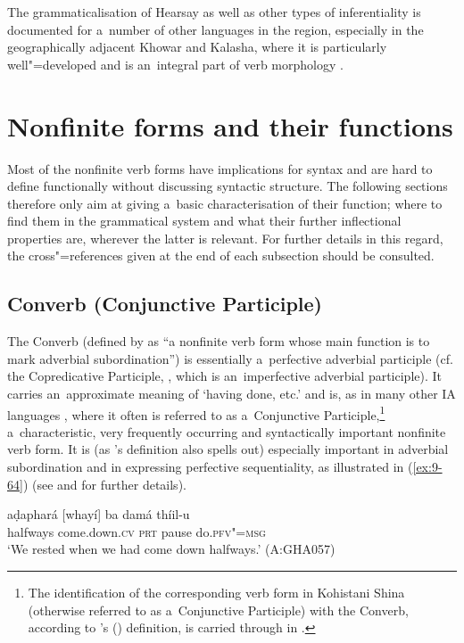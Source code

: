 The grammaticalisation of Hearsay as well as other types of inferentiality is documented for a~number of other languages in the region, especially in the geographically adjacent Khowar and Kalasha, where it is particularly well"=developed and is an~integral part of verb morphology \citep{bashir1996}. 


\section{Nonfinite forms and their functions}
\label{sec:9-3}

Most of the nonfinite verb forms have implications for syntax and are hard to define functionally without discussing syntactic structure. The following sections therefore only aim at giving a~basic characterisation of their function; where to find them in the grammatical system and what their further inflectional properties are, wherever the latter is relevant. For further details in this regard, the cross"=references given at the end of each subsection should be consulted. 


\subsection{Converb (Conjunctive Participle) }
\label{subsec:9-3-1}


The Converb (defined by \citet{haspelmath1995} as ``a nonfinite verb form whose main function is to mark adverbial subordination'') is essentially a~perfective adverbial participle (cf. the Copredicative Participle, , which is an~imperfective adverbial participle). It carries an~approximate meaning of `having done, etc.' and is, as in many other IA languages \citep[323, 397--401]{masica1991}, where it often is referred to as a~Conjunctive Participle,\footnote{The identification of the corresponding verb form in Kohistani Shina (otherwise referred to as a~Conjunctive Participle) with the Converb, according to \citeauthor{haspelmath1995}'s (\citeyear{haspelmath1995}) definition, is carried through in \citet{schmidt2003}.} a~characteristic, very frequently occurring and syntactically important nonfinite verb form. It is (as \citeauthor{haspelmath1995}'s definition also spells out) especially important in adverbial subordination and in expressing perfective sequentiality, as illustrated in (\ref{ex:9-64}) (see  and  for further details).

\begin{exe}
\ex
\label{ex:9-64}
\gll aḍaphará [whayí] ba damá thíil-u \\
halfways come.down.\textsc{cv} \textsc{prt} pause do.\textsc{pfv"=msg} \\
\glt `We rested when we had come down halfways.' (A:GHA057)
\end{exe}

